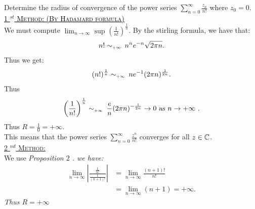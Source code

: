 \begin{example}
Determine the radius of convergence of the power series $\sum_{n=0}^{\infty} \frac{z _n }{n!}$ where $z_0 = 0$.  \\
\textcolor{black}{
  \underline{
\uline{
\textsc{
1 $^{st} $ Method: (By Hadamard formula)
}
  }
}\\
}
We must compute $\lim_{n \to \infty} \sup_{} \left( \frac{1}{n!} \right)^{\frac{1}{n}} $. By
the stirling formula, we have that: 
\[
  n! \sim_{\text{\tiny$+\infty  $ }   } n^{n}e^{-n} \sqrt{2\pi n} .
\]
Thus we get: 
\[
(n!) ^{\frac{1}{n}} \sim_{\text{\tiny$+\infty  $ }   } n e^{-1}(2 \pi n) ^{\frac{1}{2n}}.
\]
Thus \[
\left( \frac{1}{n!} \right)^{\frac{1}{n}} 
 \sim_{\text{\tiny$+\infty  $ }   }
\frac{e}{n}(2 \pi  n) ^{-\frac{1}{2n}} \rightarrow 0 \text{ as $n \rightarrow +\infty  $ } .
\]
Thus $R = \frac{1}{0} = +\infty$. \\
This means that the power series $\sum_{n=0}^{\infty} \frac{z^{n}}{n!} $ converges
for all $z \in \mathbb{C} $. \\
\newpage
  \underline{
\uline{
\textsc{
2 $^{nd} $ Method:
}
  }
}\\
We use \it Proposition $2 $ \normalfont. we have: 
\begin{align*}
\lim_{n \to \infty} \left| \frac{\frac{1}{n!}}{\frac{1}{(n+1) !}} \right|  
&= 
\lim_{n \to \infty} \frac{(n+1) !}{n!} \\
&= \lim_{n \to \infty} (n+1)  = +\infty .
\end{align*}
Thus $R = +\infty $ 
\end{example}
